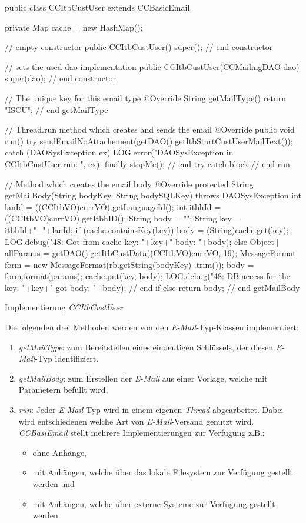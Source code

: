 \begin{program}
\begin{JavaCode}
public class CCItbCustUser extends CCBasicEmail {
	
	private Map cache = new HashMap();

	// empty constructor
	public CCItbCustUser() {
		super();
	} // end constructor
	
	// sets the used dao implementation
	public CCItbCustUser(CCMailingDAO dao) {
		super(dao);
	} // end constructor

	// The unique key for this email type
	@Override
	String getMailType() {
		return "ISCU";
	} // end getMailType
	
	// Thread.run method which creates and sends the email
	@Override
	public void run() {
		try {
			sendEmailNoAttachement(getDAO().getItbStartCustUserMailText());
		} catch (DAOSysException ex) {
			LOG.error("DAOSysException in CCItbCustUser.run: ", ex);
		} finally {
			stopMe();
		} // end try-catch-block
	} // end run
	
	// Method which creates the email body
	@Override
	protected String getMailBody(String bodyKey, String bodySQLKey)
		throws DAOSysException {
		int lanId   = ((CCItbVO)currVO).getLanguageId();
		int itbhId  = ((CCItbVO)currVO).getItbhID();
		String body = "";
		String key  = itbhId+"_"+lanId;
		if (cache.containsKey(key)) {
			body = (String)cache.get(key);
			LOG.debug("48: Got from cache key: "+key+" body: "+body);
		} else {
			Object[] allParams = getDAO().getItbCustData((CCItbVO)currVO, 19);
			MessageFormat form = new MessageFormat(rb.getString(bodyKey)
			                                         .trim());
	 		body               = form.format(params);
	 		cache.put(key, body);
	 		LOG.debug("48: DB access for the key: "+key+" got body: "+body);
		} // end if-else
		return body;
	} // end getMailBody
}
\end{JavaCode}
\caption{Implementierung \emph{CCItbCustUser}}
\label{fig:code-ccitbcustuser}
\label{CCItbCustUser.java}
\end{program}
\newpage
Die folgenden drei Methoden werden von den \emph{E-Mail}-Typ-Klassen implementiert:
\begin{enumerate}
	\item\emph{getMailType}: zum Bereitstellen eines eindeutigen Schlüssels, der diesen \emph{E-Mail}-Typ identifiziert.
	\item\emph{getMailBody}: zum Erstellen der \emph{E-Mail} aus einer Vorlage, welche mit Parametern befüllt wird.
	\item\emph{run}: Jeder \emph{E-Mail}-Typ wird in einem eigenen \emph{Thread} abgearbeitet. Dabei wird entschiedenen welche Art von \emph{E-Mail}-Versand genutzt wird. \emph{CCBasiEmail} stellt mehrere Implementierungen zur Verfügung z.B.:
	\begin{itemize}
		\item ohne Anhänge,
		\item mit Anhängen, welche über das lokale Filesystem zur Verfügung gestellt werden  und
		\item mit Anhängen, welche über externe Systeme zur Verfügung gestellt werden.
	\end{itemize}
\end{enumerate}
